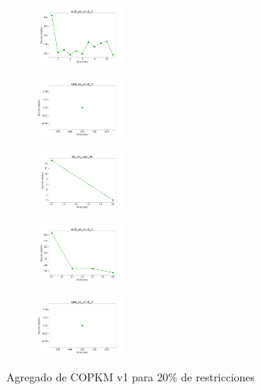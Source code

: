 \begin{figure}[H]
\begin{subfigure}
    \end{subfigure}
    \hfill
    \begin{subfigure}
        \centering
        \includegraphics[width=0.32\textwidth]{img/copkm/ecoli_set_const_20_49258669_cost.png}
    \end{subfigure}
    \hfill
    \begin{subfigure}
        \centering
        \includegraphics[width=0.32\textwidth]{img/copkm/rand_set_const_20_49258669_cost.png}
    \end{subfigure}
    \hfill
    \begin{subfigure}
        \centering
        \includegraphics[width=0.32\textwidth]{img/copkm/iris_set_const_20_3773969821_cost.png}
    \end{subfigure}
    \hfill
    \begin{subfigure}
        \centering
        \includegraphics[width=0.32\textwidth]{img/copkm/ecoli_set_const_20_3773969821_cost.png}
    \end{subfigure}
    \hfill
    \begin{subfigure}
        \centering
        \includegraphics[width=0.32\textwidth]{img/copkm/rand_set_const_20_3773969821_cost.png}
    \end{subfigure}
    \caption{Agregado de COPKM v1 para 20\% de restricciones}
\end{figure}

